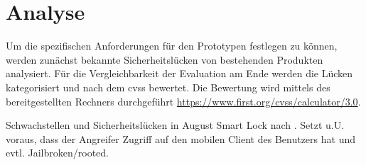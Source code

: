 \section{Analyse}
\label{sec:analysis}
	
	Um die spezifischen Anforderungen für den Prototypen festlegen zu können, werden zunächst bekannte Sicherheitslücken von bestehenden Produkten analysiert. 
	Für die Vergleichbarkeit der Evaluation am Ende werden die Lücken kategorisiert und nach dem \gls{cvss} bewertet.
	Die Bewertung wird mittels des bereitgestellten Rechners durchgeführt \url{https://www.first.org/cvss/calculator/3.0}.


	Schwachstellen und Sicherheitslücken in August Smart Lock nach \cite{Ye2017}.
	Setzt u.U. voraus, dass der Angreifer Zugriff auf den mobilen Client des Benutzers hat und evtl. Jailbroken/rooted.
